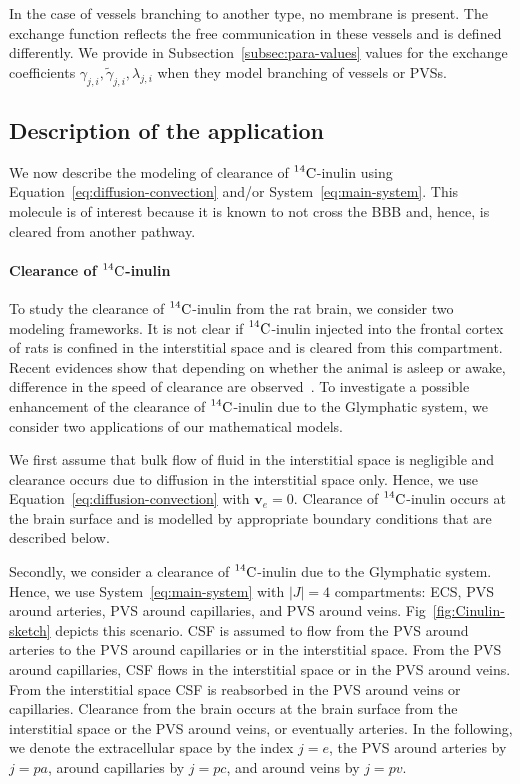 \documentclass[10pt,letterpaper]{article}
\newcommand{\VV}[1]{\textcolor{red}{VV: #1}}
\newcommand{\1}{^{(1)}}
\newcommand{\2}{^{(2)}}
\newcommand{\abs}[1]{\left\lvert#1\right\rvert}
\newcommand {\vel}   {\mathbf{v}}
\newcommand{\Cinulin}{$\prescript{14}{}{\text{C}}$-inulin }
\begin{document}
In the case of vessels branching to another type, no membrane is present. The exchange function reflects the free communication in these vessels and is defined differently. We provide in Subsection~\ref{subsec:para-values} values for the exchange coefficients $\gamma_{j , i}, \tilde \gamma_{j , i}, \lambda_{j , i}$ when they model branching of vessels or PVSs.   




\subsection{Description of the application}
We now describe the modeling of clearance of \Cinulin using Equation~\eqref{eq:diffusion-convection} and/or System~\eqref{eq:main-system}. 
This molecule is of interest because it is known to not cross the BBB and, hence, is cleared from another pathway. 

\paragraph{Clearance of \Cinulin}
To study the clearance of \Cinulin from the rat brain, we consider two modeling frameworks. 
It is not clear if \Cinulin injected into the frontal cortex of rats is confined in the interstitial space and is cleared from this compartment. Recent evidences show that depending on whether the animal is asleep or awake, difference in the speed of clearance are observed~\cite{Xie_2013_sleep}. To investigate a possible enhancement of the clearance of \Cinulin due to the Glymphatic system, we consider two applications of our mathematical models.

We first assume that bulk flow of fluid in the interstitial space is negligible and clearance occurs due to diffusion in the interstitial space only. Hence, we use Equation~\eqref{eq:diffusion-convection} with $\vel_e = 0$. Clearance of \Cinulin occurs at the brain surface and is modelled by appropriate boundary conditions that are described below. 

Secondly, we consider a clearance of \Cinulin due to the Glymphatic system. Hence, we use System~\eqref{eq:main-system} with $\abs{J}=4$ compartments: ECS, PVS around arteries, PVS around capillaries, and PVS around veins. Fig~\ref{fig:Cinulin-sketch} depicts this scenario. CSF is assumed to flow from the PVS around arteries to the PVS around capillaries or in the interstitial space. From the PVS around capillaries, CSF flows in the interstitial space or in the PVS around veins. From the interstitial space CSF is reabsorbed in the PVS around veins or capillaries. Clearance from the brain occurs at the brain surface from the interstitial space or the PVS around veins, or eventually arteries.
In the following, we denote the extracellular space by the index $j=e$, the PVS around arteries by $j=pa$, around capillaries by $j=pc$, and around veins by $j=pv$. 
\end{document}
